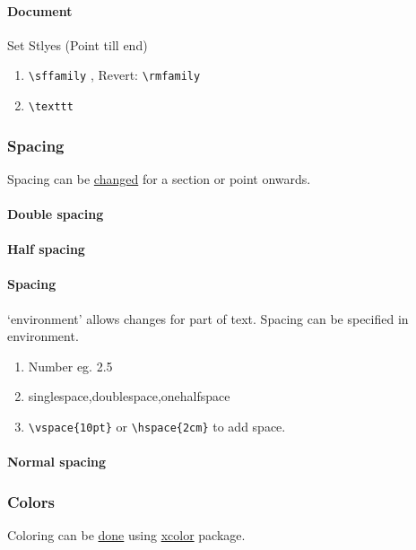\documentclass{report}[a4paper,12pt] %
\begin{document}
\paragraph{Document} Set Stlyes (Point till end)
\begin{enumerate}
  \item \verb|\sffamily| , Revert: \verb|\rmfamily|
  \item \verb|\texttt| 
\end{enumerate}

\subsubsection{Spacing} 
Spacing can be \href{https://www.overleaf.com/learn/latex/Articles/How_to_change_paragraph_spacing_in_LaTeX}{changed} for a section or point onwards.

\paragraph{Double spacing}
\doublespacing
\lipsum[1]

\paragraph{Half spacing}
\onehalfspacing
\lipsum[1]

\begin{spacing}{2.5}
\paragraph{Spacing} `environment' allows changes for part of text.
Spacing can be specified in environment.
\begin{enumerate}
  \item Number eg. 2.5
  \item singlespace,doublespace,onehalfspace
  \item \verb|\vspace{10pt}| or \verb|\hspace{2cm}| to add space.
\end{enumerate}

\lipsum[1]
\end{spacing}

\paragraph{Normal spacing}
\lipsum[1]

\subsubsection{Colors}
Coloring can be \href{https://www.overleaf.com/learn/latex/Using_colours_in_LaTeX}{done} using \href{https://mirrors.sjtug.sjtu.edu.cn/ctan/macros/latex/contrib/xcolor/xcolor.pdf}{xcolor} package.
\end{document}
